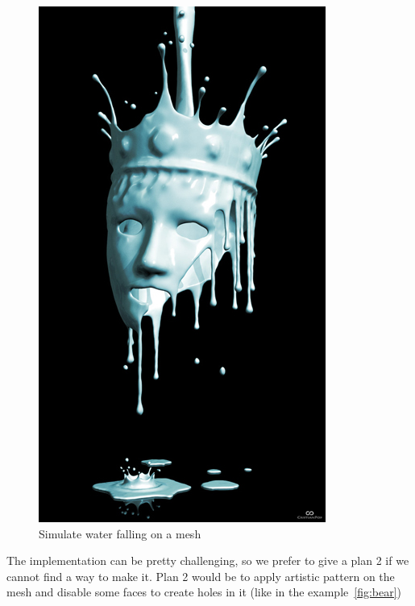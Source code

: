 \documentclass[10pt,conference,compsocconf]{IEEEtran}
\begin{document}
\begin{figure}[tbp]
	\centering
	\includegraphics[width=\columnwidth]{liquid_mesh}
	\caption{Simulate water falling on a mesh}
	\vspace{-3mm}
	\label{fig:water}
\end{figure}

The implementation can be pretty challenging, so we prefer to give a plan 2 if we cannot find a way to make it. Plan 2 would be to apply artistic pattern on the mesh and disable some faces to create holes in it (like in the example~\ref{fig:bear})
 
\end{document}
